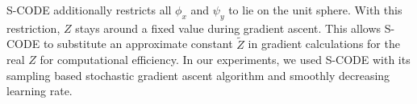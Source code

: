 S-CODE \cite{maron2010sphere} additionally restricts all $\phi_x$ and
$\psi_y$ to lie on the unit sphere.  With this restriction, $Z$ stays
around a fixed value during gradient ascent.  This allows S-CODE to
substitute an approximate constant $\tilde{Z}$ in gradient
calculations for the real $Z$ for computational efficiency.  In our
experiments, we used S-CODE with its sampling based stochastic
gradient ascent algorithm and smoothly decreasing learning rate.






